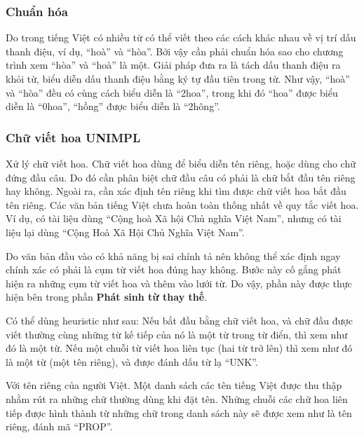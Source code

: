 \documentclass[a4paper,oneside]{book} %
\begin{document}
\subsubsection{Chuẩn hóa}

Do trong tiếng Việt có nhiều từ có thể viết theo các
cách khác nhau về vị trí dấu thanh điệu, ví dụ, ``hoà'' và
``hòa''. Bởi vậy cần phải chuẩn hóa sao cho chương trình xem ``hòa''
và ``hoà'' là một. Giải pháp đưa ra là tách dấu thanh điệu ra khỏi
từ, biểu diễn dấu thanh điệu bằng ký tự đầu tiên trong từ. Như vậy,
``hoà'' và ``hòa'' đều có cùng cách biểu diễn là ``2hoa'', trong khi
đó ``hoa'' được biểu diễn là ``0hoa'', ``hồng'' được biểu diễn là
``2hông''.

\subsubsection{Chữ viết hoa UNIMPL}

Xử lý chữ viết hoa. Chữ viết hoa dùng để biểu diễn tên riêng, hoặc
dùng cho chữ đứng đầu câu. Do đó cần phân biệt chữ đầu câu có phải là
chữ bắt đầu tên riêng hay không. Ngoài ra, cần xác định tên riêng khi
tìm được chữ viết hoa bắt đầu tên riêng. Các văn bản tiếng Việt chưa
hoàn toàn thống nhất về quy tắc viết hoa. Ví dụ, có tài liệu dùng
``Cộng hoà Xã hội Chủ nghĩa Việt Nam'', nhưng có tài liệu lại dùng
``Cộng Hoà Xã Hội Chủ Nghĩa Việt Nam''.

Do văn bản đầu vào có khả năng bị sai chính tả nên không thể xác định
ngay chính xác có phải là cụm từ viết hoa đúng hay không. Bước này cố
gắng phát hiện ra những cụm từ viết hoa và thêm vào lưới từ. Do vậy,
phần này được thực hiện bên trong phần \textbf{Phát sinh từ thay thế}. 

Có thể dùng heuristic như sau: Nếu bắt đầu bằng chữ viết hoa, và chữ
đầu được viết thường cùng những từ kế tiếp của nó là một từ trong từ
điển, thì xem như đó là một từ. Nếu một chuỗi từ viết hoa liên tục
(hai từ trở lên) thì xem như đó là một từ (một tên riêng), và được
đánh dấu từ lạ ``UNK''.

Với tên riêng của người Việt. Một danh sách các tên tiếng Việt được
thu thập nhằm rút ra những chữ thường dùng khi đặt tên. Những chuỗi
các chữ hoa liên tiếp được hình thành từ những chữ trong danh sách này
sẽ được xem như là tên riêng, đánh mã ``PROP''.
\end{document}
